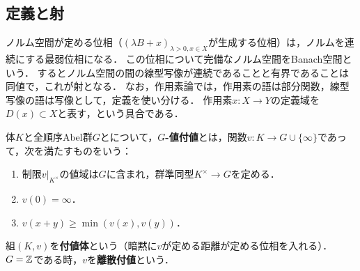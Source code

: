 \documentclass[uplatex,dvipdfmx]{jsreport}
\begin{document}
\subsection{定義と射}

\begin{tcolorbox}[colframe=ForestGreen, colback=ForestGreen!10!white,breakable,colbacktitle=ForestGreen!40!white,coltitle=black,fonttitle=\bfseries\sffamily,
title=]
    ノルム空間が定める位相（$(\lambda B+x)_{\lambda>0,x\in X}$が生成する位相）は，ノルムを連続にする最弱位相になる．
    この位相について完備なノルム空間をBanach空間という．
    するとノルム空間の間の線型写像が連続であることと有界であることは同値で，これが射となる．
    なお，作用素論では，作用素の語は部分関数，線型写像の語は写像として，定義を使い分ける．
    作用素$x:X\to Y$の定義域を$D(x)\subset X$と表す，という具合である．
\end{tcolorbox}

\begin{definition}
    体$K$と全順序Abel群$G$とについて，\textbf{$G$-値付値}とは，関数$v:K\to G\cup\{\infty\}$であって，次を満たすものをいう：
    \begin{enumerate}
        \item 制限$v|_{K^\times}$の値域は$G$に含まれ，群準同型$K^\times\to G$を定める．
        \item $v(0)=\infty$．
        \item $v(x+y)\ge\min(v(x),v(y))$．
    \end{enumerate}
    組$(K,v)$を\textbf{付値体}という（暗黙に$v$が定める距離が定める位相を入れる）．$G=\mathbb{Z}$である時，$v$を\textbf{離散付値}という．
\end{definition}
\end{document}
